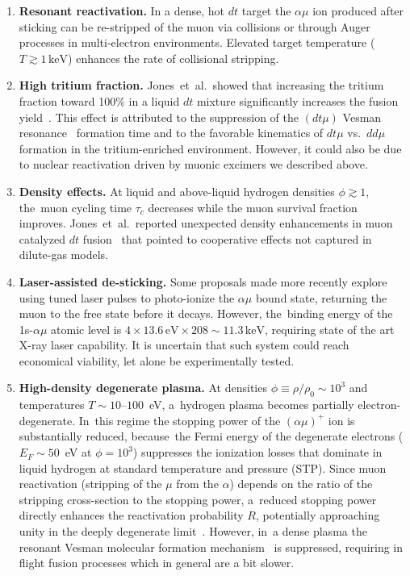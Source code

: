 \documentclass[particles,article,accept,pdftex,moreauthors]{Definitions/mdpi}
\begin{document}
\begin{enumerate}
\item {\bf Resonant reactivation.} In a dense, hot $dt$ target the $\alpha\mu$ ion produced after sticking can be re-stripped of the muon via collisions or through Auger processes in multi-electron environments. Elevated target temperature ($T \gtrsim 1\,\mathrm{keV}$) enhances the rate of collisional stripping. 
%
\item {\bf High tritium fraction.} Jones~et~al.\ showed that increasing the tritium fraction toward 100\% in a liquid $dt$ mixture significantly increases the fusion yield~\cite{jones1993evaluation}. This effect is attributed to the suppression of the $(dt\mu)$ Vesman resonance~\cite{Vesman:1967} formation time and to the favorable kinematics of $dt\mu$ vs.\ $dd\mu$ formation in the tritium-enriched environment. However, it could also be due to nuclear reactivation driven by muonic excimers we described above.
%
\item {\bf Density effects.} At liquid and above-liquid hydrogen densities $\phi \gtrsim 1$, the~muon cycling time $\tau_c$ decreases while the muon survival fraction improves. Jones~et~al.\ reported unexpected density enhancements in muon catalyzed $dt$ fusion~\cite{Jones:1986kk} that pointed to cooperative effects not captured in dilute-gas models. 
%
\item {\bf Laser-assisted de-sticking.} Some proposals made more recently explore using tuned laser pulses to photo-ionize the $\alpha\mu$ bound state, returning the muon to the free state before it decays. However, the~binding energy of the 1s-$\alpha\mu$ atomic level is $4\times 13.6\,\mathrm{eV}\times 208\sim 11.3\,\mathrm{keV}$, requiring state of the art X-ray laser capability. It is uncertain that such system could reach economical viability, let alone be experimentally tested.
%
\item {\bf High-density degenerate plasma.} At densities $\phi\equiv\rho/\rho_0\sim 10^3$ and temperatures $T\sim 10$--$100$~eV, a~hydrogen plasma becomes partially electron-degenerate. In~this regime the stopping power of the $(\alpha\mu)^+$ ion is substantially reduced, because~the Fermi energy of the degenerate electrons ($E_F\sim 50$~eV at $\phi=10^3$) suppresses the ionization losses that dominate in liquid hydrogen at standard temperature and pressure (STP). Since muon reactivation (stripping of the $\mu$ from the $\alpha$) depends on the ratio of the stripping cross-section to the stopping power, a~reduced stopping power directly enhances the reactivation probability $R$, potentially approaching unity in the deeply degenerate limit~\cite{Rafelski:1988wq,Rafelski:1991DOE}. However, in~a dense plasma the resonant Vesman molecular formation mechanism~\cite{Vesman:1967} is suppressed, requiring in flight fusion processes which in general are a bit slower.
%
\end{enumerate}
\end{document}
